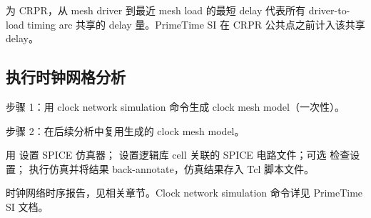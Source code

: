 为 CRPR，从 mesh driver 到最近 mesh load 的最短 delay 代表所有 driver-to-load timing arc 共享的 delay 量。PrimeTime SI 在 CRPR 公共点之前计入该共享 delay。


\subsection{执行时钟网格分析}
步骤 1：用 clock network simulation 命令生成 clock mesh model（一次性）。


步骤 2：在后续分析中复用生成的 clock mesh model。


用  设置 SPICE 仿真器； 设置逻辑库 cell 关联的 SPICE 电路文件；可选  检查设置； 执行仿真并将结果 back-annotate，仿真结果存入 Tcl 脚本文件。

\begin{seeAlsoBox}
时钟网络时序报告，见相关章节。Clock network simulation 命令详见 PrimeTime SI 文档。
\end{seeAlsoBox}

